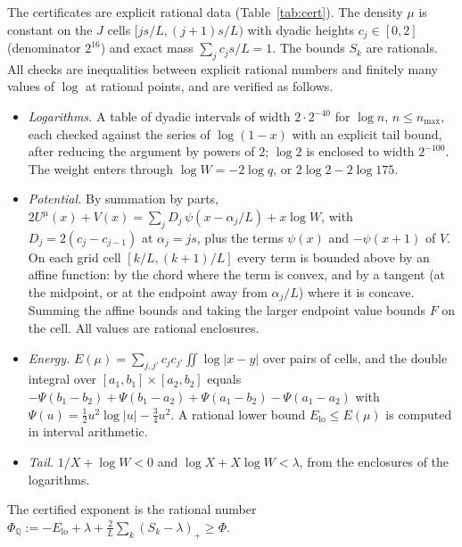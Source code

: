 \documentclass[11pt]{amsart}
\theoremstyle{definition}
\theoremstyle{remark}
\numberwithin{equation}{section}
\begin{document}
The certificates are explicit rational data (Table~\ref{tab:cert}). The density $\mu$ is constant on the $J$ cells
$[js/L,(j+1)s/L)$ with dyadic heights $c_j\in[0,2]$ (denominator $2^{16}$) and exact mass $\sum_jc_js/L=1$. The bounds
$S_k$ are rationals. All checks are inequalities between explicit rational numbers and finitely many values of $\log$ at
rational points, and are verified as follows.
\begin{itemize}
\item \emph{Logarithms.} A table of dyadic intervals of width $2\cdot2^{-40}$ for $\log n$, $n\le n_{\max}$, each checked
  against the series of $\log(1-x)$ with an explicit tail bound, after reducing the argument by powers of $2$; $\log2$
  is enclosed to width $2^{-100}$. The weight enters through $\log W=-2\log q$, or $2\log2-2\log175$.
\item \emph{Potential.} By summation by parts,
  $2U^\mu(x)+V(x)=\sum_jD_j\,\psi(x-\alpha_j/L)+x\log W$, with $D_j=2(c_j-c_{j-1})$ at $\alpha_j=js$, plus the terms
  $\psi(x)$ and $-\psi(x+1)$ of $V$. On each grid cell $[k/L,(k+1)/L]$ every term is bounded above by an affine
  function: by the chord where the term is convex, and by a tangent (at the midpoint, or at the endpoint away from
  $\alpha_j/L$) where it is concave. Summing the affine bounds and taking the larger endpoint value bounds $F$ on the
  cell. All values are rational enclosures.
\item \emph{Energy.} $E(\mu)=\sum_{j,j'}c_jc_{j'}\iint\log|x-y|$ over pairs of cells, and the double integral over
  $[a_1,b_1]\times[a_2,b_2]$ equals $-\Psi(b_1-b_2)+\Psi(b_1-a_2)+\Psi(a_1-b_2)-\Psi(a_1-a_2)$ with
  $\Psi(u)=\frac12u^2\log|u|-\frac34u^2$. A rational lower bound $E_{\mathrm{lo}}\le E(\mu)$ is computed in interval
  arithmetic.
\item \emph{Tail.} $1/X+\log W<0$ and $\log X+X\log W<\lambda$, from the enclosures of the logarithms.
\end{itemize}
The certified exponent is the rational number $\Phi_{\mathbb Q}:=-E_{\mathrm{lo}}+\lambda+\frac2L\sum_k(S_k-\lambda)_+\ge\Phi$.
\end{document}
